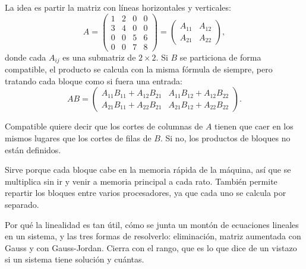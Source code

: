 \documentclass[11pt,letterpaper]{article}
\begin{document}
La idea es partir la matriz con líneas horizontales y verticales:
\[
    A =
    \left(\begin{array}{cc|cc}
        1 & 2 & 0 & 0 \\
        3 & 4 & 0 & 0 \\ \hline
        0 & 0 & 5 & 6 \\
        0 & 0 & 7 & 8
    \end{array}\right)
    =
    \begin{pmatrix}
        A_{11} & A_{12} \\ A_{21} & A_{22}
    \end{pmatrix} ,
\]
donde cada $A_{ij}$ es una submatriz de $2 \times 2$. Si $B$ se
particiona de forma compatible, el producto se calcula con la misma
fórmula de siempre, pero tratando cada bloque como si fuera una
entrada:
\[
    AB =
    \begin{pmatrix}
        A_{11}B_{11} + A_{12}B_{21} & A_{11}B_{12} + A_{12}B_{22} \\
        A_{21}B_{11} + A_{22}B_{21} & A_{21}B_{12} + A_{22}B_{22}
    \end{pmatrix} .
\]

\begin{ojo}
    Compatible quiere decir que los cortes de columnas de $A$ tienen
    que caer en los mismos lugares que los cortes de filas de $B$. Si
    no, los productos de bloques no están definidos.
\end{ojo}

\begin{idea}
    Sirve porque cada bloque cabe en la memoria rápida de la máquina,
    así que se multiplica sin ir y venir a memoria principal a cada
    rato. También permite repartir los bloques entre varios
    procesadores, ya que cada uno se calcula por separado.
\end{idea}

\newpage



\begin{quick_sum}
    Por qué la linealidad es tan útil, cómo se junta un montón de
    ecuaciones lineales en un sistema, y las tres formas de
    resolverlo: eliminación, matriz aumentada con Gauss y con
    Gauss-Jordan. Cierra con el rango, que es lo que dice de un
    vistazo si un sistema tiene solución y cuántas.
\end{quick_sum}
\end{document}
